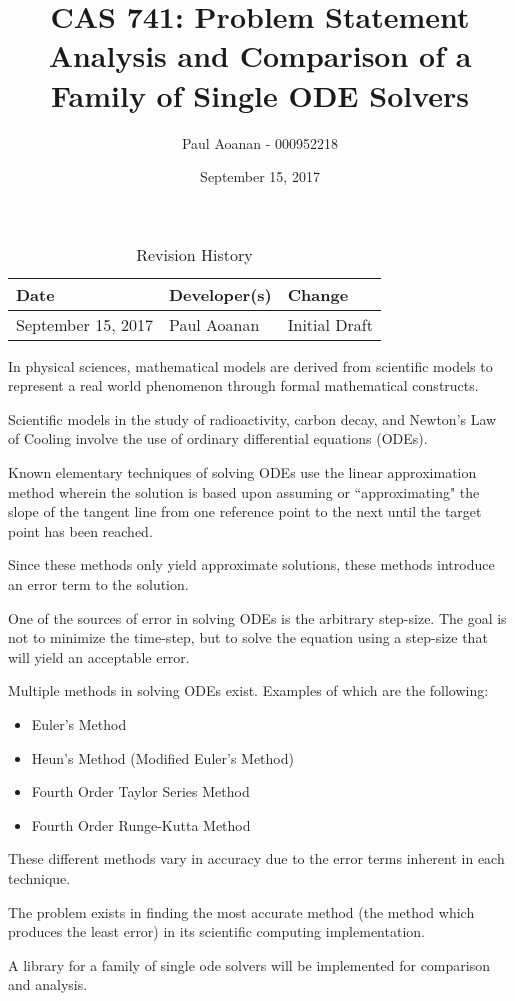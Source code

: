 \documentclass{article}
\title{CAS 741: Problem Statement\\Analysis and Comparison of a Family of Single ODE Solvers}
\author{Paul Aoanan - 000952218}
\date{September 15, 2017}
\begin{document}
\maketitle

\begin{table}[hp]
\caption{Revision History} \label{TblRevisionHistory}
\begin{tabularx}{\textwidth}{llX}
\toprule
\textbf{Date} & \textbf{Developer(s)} & \textbf{Change}\\
\midrule
September 15, 2017 & Paul Aoanan & Initial Draft\\
\bottomrule
\end{tabularx}
\end{table}

In physical sciences, mathematical models are derived from scientific models to represent a real world phenomenon through formal mathematical constructs.

Scientific models in the study of radioactivity, carbon decay, and Newton's Law of Cooling
involve the use of ordinary differential equations (ODEs).

Known elementary techniques of solving ODEs use the linear approximation method wherein the
solution is based upon assuming or ``approximating" the slope of the tangent line from one
reference point to the next until the target point has been reached.

Since these methods only yield approximate solutions, these methods introduce an error term to
the solution.

One of the sources of error in solving ODEs is the arbitrary step-size.
The goal is not to minimize the time-step, but to solve the equation using a step-size that will yield an acceptable error.

Multiple methods in solving ODEs exist.
Examples of which are the following:
\begin{itemize}
	\item Euler's Method
	\item Heun's Method (Modified Euler's Method)
	\item Fourth Order Taylor Series Method
	\item Fourth Order Runge-Kutta Method
\end{itemize}

These different methods vary in accuracy due to the error terms inherent in each technique.

The problem exists in finding the most accurate method (the method which produces the least error) in its scientific computing implementation.

A library for a family of single ode solvers will be implemented for comparison and analysis.




\end{document}
